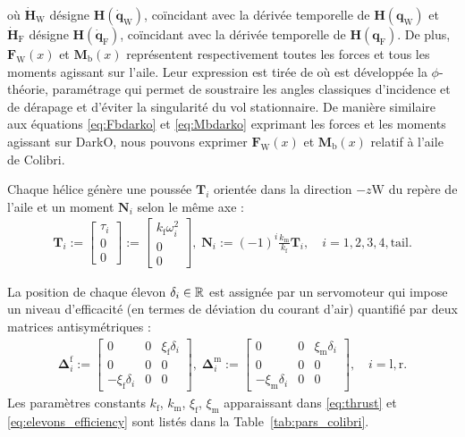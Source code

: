 où $\dot{\boldsymbol{H}}_{\text{W}}$ désigne $\boldsymbol{H}(\dot{\boldsymbol{q}}_{\text{W}})$, coïncidant avec la dérivée temporelle de $\boldsymbol{H}(\boldsymbol{q}_{\text{W}})$ et $\dot{\boldsymbol{H}}_{\text{F}}$ désigne $\boldsymbol{H}(\dot{\boldsymbol{q}}_{\text{F}})$, coïncidant avec la dérivée temporelle de $\boldsymbol{H}(\boldsymbol{q}_{\text{F}})$. De plus, $\boldsymbol{F}_{\text{W}}(x)$ et $\boldsymbol{M}_{\text{b}}(x)$ représentent respectivement toutes les forces et tous les moments agissant sur l'aile. Leur expression est tirée de \cite[équations (45) et (57)]{lustosaHal-03035938} où est développée la $\phi$-théorie, paramétrage qui permet de soustraire les angles classiques d'incidence et de dérapage et d'éviter la singularité du vol stationnaire. De manière similaire aux équations \eqref{eq:Fbdarko} et \eqref{eq:Mbdarko} exprimant les forces et les moments agissant sur DarkO, nous pouvons exprimer $\boldsymbol{F}_{\text{W}}(x)$ et $\boldsymbol{M}_{\text{b}}(x)$ relatif à l'aile de Colibri.

Chaque hélice génère une poussée $\boldsymbol{T}_i$ orientée dans la direction $-z{\text{W}}$ du repère de l'aile et un moment $\boldsymbol{N}_i$ selon le même axe :
\begin{align}
\label{eq:thrustcolibri}
\boldsymbol{T}_{i} \!:=\! \begin{bmatrix} \tau_{i} \\ 0 \\ 0 \end{bmatrix} \!:=\!
\begin{bmatrix} k_{\text{f}}\omega_{i}^{2} \\ 0 \\ 0 \end{bmatrix}\! , \;
\boldsymbol{N}_{i} \!:=\! (-1)^{i}  \frac{k_{\text{m}} }{k_{\text{f}}}\boldsymbol{T}_{i}, \quad i=1,2,3,4,\text{tail} .
\end{align}  

La position de chaque élevon $\delta_i \in {\mathbb R}$ est assignée par un servomoteur qui impose un niveau d'efficacité (en termes de déviation du courant d'air) quantifié par deux matrices antisymétriques :
\begin{align}
\label{eq:elevons_efficiency_colibri}
    \boldsymbol{\Delta}^{\text{f}}_{i} \!:=\! \begin{bmatrix} 0 & 0 & \xi_{\text{f}}\delta_{i} \\ 0 & 0 & 0 \\ -\xi_{\text{f}}\delta_{i} & 0 & 0 \end{bmatrix}\! ,\;
    \boldsymbol{\Delta}^{\text{m}}_{i} \!:=\! \begin{bmatrix} 0 & 0 & \xi_{\text{m}}\delta_{i} \\ 0 & 0 & 0 \\ -\xi_{\text{m}}\delta_{i} & 0 & 0 \end{bmatrix} \!, \quad i=\text{l},\text{r}.
\end{align}
 Les paramètres constants $k_{\text{f}}$, $k_{\text{m}}$, $\xi_{\text{f}}$, $\xi_{\text{m}}$ apparaissant dans \eqref{eq:thrust} et \eqref{eq:elevons_efficiency} sont listés dans la Table~\ref{tab:pars_colibri}.

